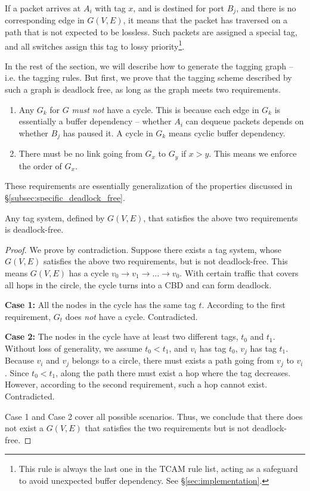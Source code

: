 If a packet arrives at $A_i$ with tag $x$, and is destined for port $B_j$, and
there is no corresponding edge in $G(V,E)$, it means that the packet has
traversed on a path that is not expected to be lossless.  Such packets are
assigned a special tag, and all switches assign this tag to lossy
priority\footnote{This rule is always the last one in the
TCAM rule list, acting as a safeguard to avoid unexpected buffer dependency.
See \S\ref{sec:implementation}.}.

In the rest of the section, we will describe how to generate the tagging graph
-- i.e. the tagging rules. But first, we prove that the tagging scheme described
by such a graph is deadlock free, as long as the graph meets two requirements.

\begin{enumerate}

		\item  Any $G_k$ for $G$ {\em must not} have a cycle.  This is
				because each edge in $G_k$ is essentially a buffer dependency --
				whether $A_i$ can dequeue packets depends on whether $B_j$ has
				paused it. A cycle in $G_k$ means cyclic buffer
				dependency.
		\item There must be no link going from
				$G_x$ to $G_y$ if $x>y$.  This means we enforce the order of
				$G_x$.
\end{enumerate}

These requirements are essentially generalization of the properties
discussed in \S\ref{subsec:specific_deadlock_free}.

\begin{theorem}
Any tag system, defined by $G(V,E)$, that satisfies the above two requirements is deadlock-free.
\end{theorem}

\begin{proof}
We prove by contradiction. Suppose there exists a tag system,
whose $G(V,E)$ satisfies the above two requirements, but is not deadlock-free. This means
$G(V,E)$ has a cycle $v_0 \rightarrow v_1 \rightarrow ... \rightarrow v_0$. With certain
traffic that covers all hops in the circle, the cycle turns into a CBD and can form deadlock.

\textbf{Case 1:} All the nodes in the cycle has the same tag $t$. According to
the first requirement, $G_t$ does {\em not} have a cycle. Contradicted.

\textbf{Case 2:} The nodes in the cycle have at least two different tags, $t_0$ and $t_1$.
Without loss of generality, we assume $t_0 < t_1$, and $v_i$ has tag $t_0$, $v_j$
has tag $t_1$. Because $v_i$ and $v_j$ belongs to a circle, there must exists
a path going from $v_j$ to $v_i$. Since $t_0 < t_1$, along the path there must exist
a hop where the tag decreases. However, according to the second requirement, such a hop
cannot exist. Contradicted.

Case 1 and Case 2 cover all possible scenarios. Thus, we conclude that there does not
exist a $G(V,E)$ that satisfies the two requirements but is not deadlock-free.
\end{proof}

